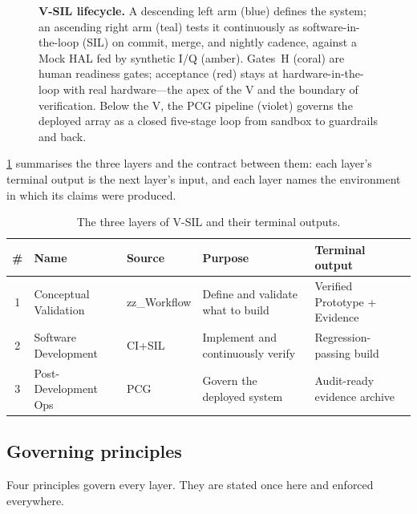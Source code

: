 \documentclass[11pt,a4paper]{article}
\begin{document}
\begin{figure}[htbp]
\begin{tikzpicture}
\end{tikzpicture}
\caption{\textbf{V-SIL lifecycle.} A descending left arm (blue) defines the system; an ascending
right arm (teal) tests it continuously as software-in-the-loop (SIL) on commit, merge, and
nightly cadence, against a Mock HAL fed by synthetic I/Q (amber). Gates~H (coral) are human
readiness gates; acceptance (red) stays at hardware-in-the-loop with real hardware---the apex of
the V and the boundary of verification. Below the V, the PCG pipeline (violet) governs the
deployed array as a closed five-stage loop from sandbox to guardrails and back.}
\label{fig:vsil}
\end{figure}

\cref{tab:layers} summarises the three layers and the contract between them: each layer's
terminal output is the next layer's input, and each layer names the environment in which its
claims were produced.

\begin{table}[htbp]
\centering
\caption{The three layers of V-SIL and their terminal outputs.}
\label{tab:layers}
\small
\begin{tabular}{@{}clllp{4.2cm}@{}}
\toprule
\textbf{\#} & \textbf{Name} & \textbf{Source} & \textbf{Purpose} & \textbf{Terminal output} \\
\midrule
1 & Conceptual Validation & zz\_Workflow & Define and validate what to build & Verified Prototype + Evidence \\
2 & Software Development & CI+SIL & Implement and continuously verify & Regression-passing build \\
3 & Post-Development Ops & PCG & Govern the deployed system & Audit-ready evidence archive \\
\bottomrule
\end{tabular}
\end{table}

\subsection{Governing principles}
\label{sec:principles}

Four principles govern every layer. They are stated once here and enforced everywhere.
\end{document}

